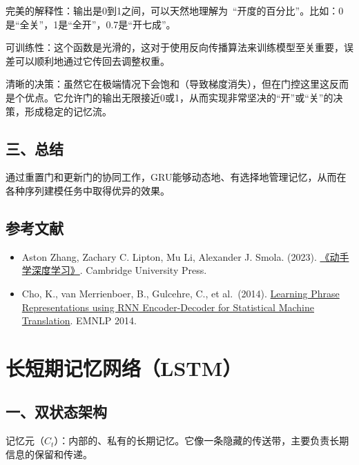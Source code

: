 完美的解释性：输出是0到1之间，可以天然地理解为~``开度的百分比''。比如：0是``全关''，1是``全开''，0.7是``开七成''。

可训练性：这个函数是光滑的，这对于使用反向传播算法来训练模型至关重要，误差可以顺利地通过它传回去调整权重。

清晰的决策：虽然它在极端情况下会饱和（导致梯度消失），但在门控这里这反而是个优点。它允许门的输出无限接近0或1，从而实现非常坚决的``开''或``关''的决策，形成稳定的记忆流。

\hypertarget{ux4e09ux603bux7ed3}{%
\subsection{三、总结}\label{ux4e09ux603bux7ed3}}

通过重置门和更新门的协同工作，GRU能够动态地、有选择地管理记忆，从而在各种序列建模任务中取得优异的效果。

\hypertarget{ux53c2ux8003ux6587ux732e-18}{%
\subsection{参考文献}\label{ux53c2ux8003ux6587ux732e-18}}

\begin{itemize}
\tightlist
\item
  Aston Zhang, Zachary C. Lipton, Mu Li, Alexander J. Smola. (2023). \href{https://zh.d2l.ai/}{《动手学深度学习》}. Cambridge University Press.
\item
  Cho, K., van Merrienboer, B., Gulcehre, C., et al.~(2014). \href{https://arxiv.org/abs/1406.1078}{Learning Phrase Representations using RNN Encoder-Decoder for Statistical Machine Translation}. EMNLP 2014.
\end{itemize}

\clearpage

\hypertarget{ux957fux77edux671fux8bb0ux5fc6ux7f51ux7edclstm}{%
\section{长短期记忆网络（LSTM）}\label{ux957fux77edux671fux8bb0ux5fc6ux7f51ux7edclstm}}

\hypertarget{ux4e00ux53ccux72b6ux6001ux67b6ux6784}{%
\subsection{一、双状态架构}\label{ux4e00ux53ccux72b6ux6001ux67b6ux6784}}

记忆元（\(C_t\)）：内部的、私有的长期记忆。它像一条隐藏的传送带，主要负责长期信息的保留和传递。

